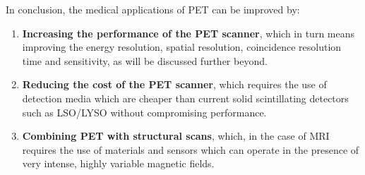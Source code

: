 In conclusion, the medical applications of PET can be improved by:
\begin{enumerate}
\item {\bf Increasing the performance of the PET scanner}, which in turn means improving the energy resolution, spatial resolution, coincidence resolution time and sensitivity, as will be discussed further beyond.
\item {\bf Reducing the cost of the PET scanner}, which requires the use of detection media which are cheaper than current solid scintillating detectors such as LSO/LYSO without compromising performance.
\item {\bf Combining PET with structural scans}, which, in the case of MRI requires the use of materials and sensors which can operate in the presence of very intense, highly variable magnetic fields. 
\end{enumerate}
